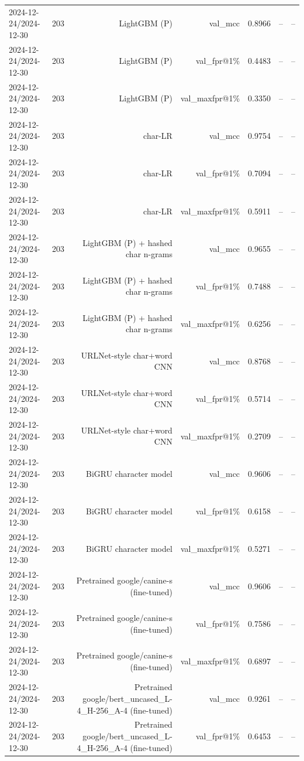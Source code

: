 \begin{table}[t]
\begin{tabular}{llrrrrr}
2024-12-24/2024-12-30 & 203 & LightGBM (P) & val\_mcc & 0.8966 & -- & -- \\
2024-12-24/2024-12-30 & 203 & LightGBM (P) & val\_fpr@1\% & 0.4483 & -- & -- \\
2024-12-24/2024-12-30 & 203 & LightGBM (P) & val\_maxfpr@1\% & 0.3350 & -- & -- \\
2024-12-24/2024-12-30 & 203 & char-LR & val\_mcc & 0.9754 & -- & -- \\
2024-12-24/2024-12-30 & 203 & char-LR & val\_fpr@1\% & 0.7094 & -- & -- \\
2024-12-24/2024-12-30 & 203 & char-LR & val\_maxfpr@1\% & 0.5911 & -- & -- \\
2024-12-24/2024-12-30 & 203 & LightGBM (P) + hashed char n-grams & val\_mcc & 0.9655 & -- & -- \\
2024-12-24/2024-12-30 & 203 & LightGBM (P) + hashed char n-grams & val\_fpr@1\% & 0.7488 & -- & -- \\
2024-12-24/2024-12-30 & 203 & LightGBM (P) + hashed char n-grams & val\_maxfpr@1\% & 0.6256 & -- & -- \\
2024-12-24/2024-12-30 & 203 & URLNet-style char+word CNN & val\_mcc & 0.8768 & -- & -- \\
2024-12-24/2024-12-30 & 203 & URLNet-style char+word CNN & val\_fpr@1\% & 0.5714 & -- & -- \\
2024-12-24/2024-12-30 & 203 & URLNet-style char+word CNN & val\_maxfpr@1\% & 0.2709 & -- & -- \\
2024-12-24/2024-12-30 & 203 & BiGRU character model & val\_mcc & 0.9606 & -- & -- \\
2024-12-24/2024-12-30 & 203 & BiGRU character model & val\_fpr@1\% & 0.6158 & -- & -- \\
2024-12-24/2024-12-30 & 203 & BiGRU character model & val\_maxfpr@1\% & 0.5271 & -- & -- \\
2024-12-24/2024-12-30 & 203 & Pretrained google/canine-s (fine-tuned) & val\_mcc & 0.9606 & -- & -- \\
2024-12-24/2024-12-30 & 203 & Pretrained google/canine-s (fine-tuned) & val\_fpr@1\% & 0.7586 & -- & -- \\
2024-12-24/2024-12-30 & 203 & Pretrained google/canine-s (fine-tuned) & val\_maxfpr@1\% & 0.6897 & -- & -- \\
2024-12-24/2024-12-30 & 203 & Pretrained google/bert\_uncased\_L-4\_H-256\_A-4 (fine-tuned) & val\_mcc & 0.9261 & -- & -- \\
2024-12-24/2024-12-30 & 203 & Pretrained google/bert\_uncased\_L-4\_H-256\_A-4 (fine-tuned) & val\_fpr@1\% & 0.6453 & -- & -- \\

\end{tabular}
\end{table}

